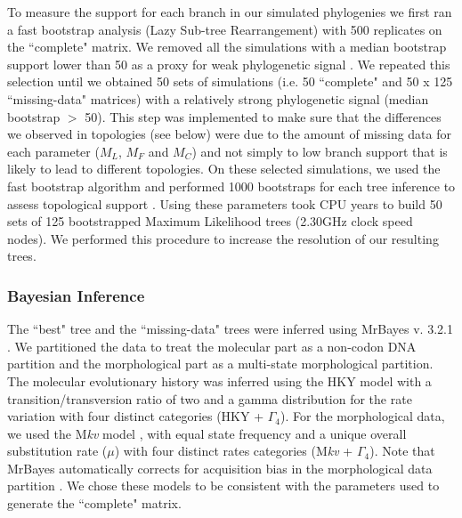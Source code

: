 \documentclass[12pt,letterpaper]{article}
\begin{document}
To measure the support for each branch in our simulated phylogenies we first ran a fast bootstrap analysis (Lazy Sub-tree Rearrangement) with 500 replicates on the ``complete" matrix.
We removed all the simulations with a median bootstrap support lower than 50 as a proxy for weak phylogenetic signal \citep{zanderminimal2004}.
We repeated this selection until we obtained 50 sets of simulations (i.e. 50 ``complete" and 50 x 125 ``missing-data" matrices) with a relatively strong phylogenetic signal (median bootstrap $>$ 50).
This step was implemented to make sure that the differences we observed in topologies (see below) were due to the amount of missing data for each parameter ($M_L$, $M_F$ and $M_C$) and not simply to low branch support that is likely to lead to different topologies.
On these selected simulations, we used the fast bootstrap algorithm and performed 1000 bootstraps for each tree inference to assess topological support \citep{pattengale2010many}.
Using these parameters took  CPU years to build 50 sets of 125 bootstrapped Maximum Likelihood trees (2.30GHz clock speed nodes). We performed this procedure to increase the resolution of our resulting trees. 

\subsubsection{Bayesian Inference}
The ``best" tree and the ``missing-data" trees were inferred using MrBayes v. 3.2.1 \citep{Ronquist2012mrbayes}.
We partitioned the data to treat the molecular part as a non-codon DNA partition and the morphological part as a multi-state morphological partition.
The molecular evolutionary history was inferred using the HKY model with a transition/transversion ratio of two \citep{douadycomparison2003} and a gamma distribution for the rate variation with four distinct categories (HKY + $\Gamma_4$).
For the morphological data, we used the M\textit{kv} model \citep{lewisa2001}, with equal state frequency and a unique overall substitution rate ($\mu$) with four distinct rates categories (M\textit{kv} + $\Gamma_4$).
Note that MrBayes automatically corrects for acquisition bias in the morphological data partition \citep{Nylander01022004,Ronquist2012mrbayes}.
We chose these models to be consistent with the parameters used to generate the ``complete" matrix.
\end{document}
